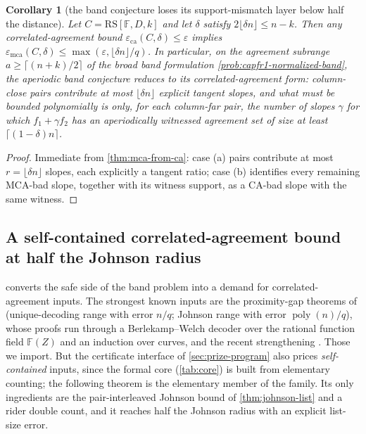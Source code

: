 \documentclass[11pt]{article}
\newtheorem{corollary}[corollary]{Corollary}
\theoremstyle{definition}
\theoremstyle{remark}
\newcommand{\F}{\mathbb{F}}
\newcommand{\RS}{\mathrm{RS}}
\newcommand{\eca}{\varepsilon_{\mathrm{ca}}}
\newcommand{\emca}{\varepsilon_{\mathrm{mca}}}
\begin{document}
\begin{corollary}[the band conjecture loses its support-mismatch layer below half the distance]\label{cor:band-reduction}
Let $C=\RS[\F,D,k]$ and let $\delta$ satisfy $2\lfloor\delta n\rfloor\le n-k$. Then any correlated-agreement bound $\eca(C,\delta)\le\varepsilon$ implies $\emca(C,\delta)\le\max(\varepsilon,\lfloor\delta n\rfloor/q)$. In particular, on the agreement subrange $a\ge\lceil(n+k)/2\rceil$ of the broad band formulation \cref{prob:capfr1-normalized-band}, the aperiodic band conjecture reduces to its correlated-agreement form: column-close pairs contribute at most $\lfloor\delta n\rfloor$ explicit tangent slopes, and what must be bounded polynomially is only, for each column-far pair, the number of slopes $\gamma$ for which $f_1+\gamma f_2$ has an aperiodically witnessed agreement set of size at least $\lceil(1-\delta)n\rceil$.
\end{corollary}

\begin{proof}
Immediate from \cref{thm:mca-from-ca}: case \textup{(a)} pairs contribute at most $r=\lfloor\delta n\rfloor$ slopes, each explicitly a tangent ratio; case \textup{(b)} identifies every remaining MCA-bad slope, together with its witness support, as a CA-bad slope with the same witness.
\end{proof}

\subsection{A self-contained correlated-agreement bound at half the Johnson radius}\label{sec:pincer-ca}

 converts the safe side of the band problem into a demand for correlated-agreement inputs. The strongest known inputs are the proximity-gap theorems of \cite{BCIKS20} (unique-decoding range with error $n/q$; Johnson range with error $\operatorname{poly}(n)/q$), whose proofs run through a Berlekamp--Welch decoder over the rational function field $\F(Z)$ and an induction over curves, and the recent strengthening \cite{BCHKS25}. Those we import. But the certificate interface of \cref{sec:prize-program} also prices \emph{self-contained} inputs, since the formal core (\cref{tab:core}) is built from elementary counting; the following theorem is the elementary member of the family. Its only ingredients are the pair-interleaved Johnson bound of \cref{thm:johnson-list} and a rider double count, and it reaches half the Johnson radius with an explicit list-size error.
\end{document}
